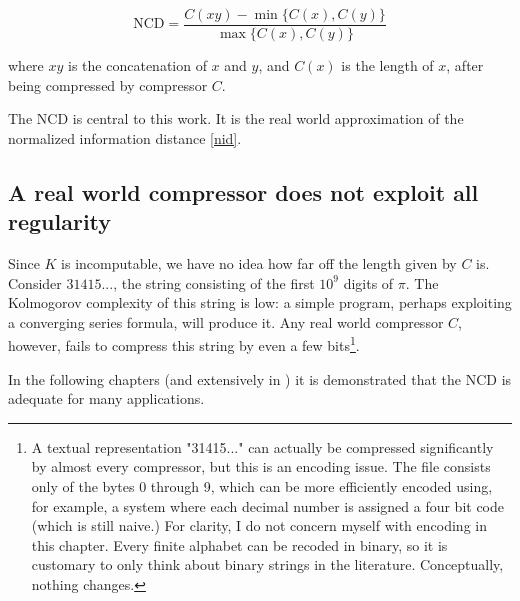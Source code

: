 \begin{equation}\label{ncd}
  \text{NCD} = \frac{C(xy) - \min \{ C(x), C(y) \}}{\max \{ C(x), C(y) \}}
\end{equation}

where $xy$ is the concatenation of $x$ and $y$, and $C(x)$ is the length of $x$, after being compressed by compressor $C$.

The $\text{NCD}$ is central to this work. It is the real world approximation of the normalized information distance \eqref{nid}.

\subsection{A real world compressor does not exploit all regularity}
Since $K$ is incomputable, we have no idea how far off the length given by $C$ is. Consider $31415...$, the string consisting of the first $10^{9}$ digits of $\pi$. The Kolmogorov complexity of this string is low: a simple program, perhaps exploiting a converging series formula, will produce it. Any real world compressor $C$, however, fails to compress this string by even a few bits\footnote{A textual representation "31415..." can actually be compressed significantly by almost every compressor, but this is an encoding issue. The file consists only of the bytes 0 through 9, which can be more efficiently encoded using, for example, a system where each decimal number is assigned a four bit code (which is still naive.) For clarity, I do not concern myself with encoding in this chapter. Every finite alphabet can be recoded in binary, so it is customary to only think about binary strings in the literature. Conceptually, nothing changes. }.

In the following chapters (and extensively in \cite{Cilibrasi2005}) it is demonstrated that the $\text{NCD}$ is adequate for many applications.
